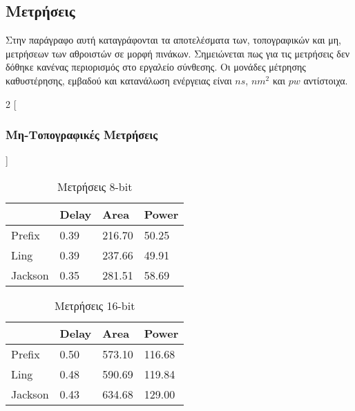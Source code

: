 \clearpage
\subsection{Μετρήσεις}
Στην παράγραφο αυτή καταγράφονται τα αποτελέσματα των, τοπογραφικών και μη, μετρήσεων των αθροιστών σε μορφή πινάκων. Σημειώνεται πως για τις μετρήσεις δεν δόθηκε κανένας περιορισμός στο εργαλείο σύνθεσης. Οι μονάδες μέτρησης καθυστέρησης, εμβαδού και κατανάλωση ενέργειας είναι $ns$, $nm^2$ και $pw$ αντίστοιχα.
\begin{multicols}{2}
[\subsubsection{Μη-Τοπογραφικές Μετρήσεις}]
\begin{table}[H]
\centering
     \begin{tabular}{||p{1.2cm} | p{0.7cm}  p{1cm}  p{1cm} ||} 
        \hline
         & Delay & Area & Power \\ [0.5ex] 
        \hline\hline
        Prefix  & 0.39  & 216.70    & 50.25 \\ 
        \hline
        Ling    & 0.39  & 237.66    & 49.91 \\
        \hline
        Jackson & 0.35  & 281.51    & 58.69 \\
        \hline
    \end{tabular}
\caption{Μετρήσεις 8-bit}
\label{result_table_8}
\end{table}
\begin{table}[H]
\centering
     \begin{tabular}{||p{1.2cm} | p{0.7cm} p{1cm} p{1cm} ||} 
        \hline
        & Delay & Area & Power \\ [0.5ex] 
        \hline\hline
        Prefix  & 0.50  & 573.10    & 116.68 \\ 
        \hline
        Ling    & 0.48  & 590.69    & 119.84 \\
        \hline
        Jackson & 0.43  & 634.68    & 129.00 \\
        \hline
    \end{tabular}
\caption{Μετρήσεις 16-bit}
\label{result_table_16}
\end{table}
\begin{table}[H]
\centering
     \begin{tabular}{||p{1.2cm} | p{0.7cm} p{1cm} p{1cm} ||} 

\end{tabular}
\end{table}
\end{multicols}
